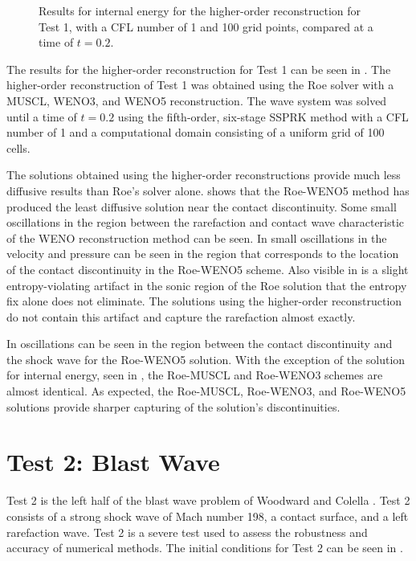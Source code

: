 \begin{figure}
	\caption[Results for internal energy for the higher-order reconstruction for Test 1, with a CFL number of 1 and 100 grid points, compared at a time of $t=0.2$.]{Results for internal energy for the higher-order reconstruction for Test 1, with a CFL number of 1 and 100 grid points, compared at a time of $t=0.2$.}
	\label{fig:Test1HORenergy}
\end{figure}
The results for the higher-order reconstruction for Test 1 can be seen in . The higher-order reconstruction of Test 1 was obtained using the Roe solver with a MUSCL, WENO3, and WENO5 reconstruction. The wave system was solved until a time of $t=0.2$ using the fifth-order, six-stage SSPRK method with a CFL number of 1 and a computational domain consisting of a uniform grid of 100 cells.

The solutions obtained using the higher-order reconstructions provide much less diffusive results than Roe's solver alone.  shows that the Roe-WENO5 method has produced the least diffusive solution near the contact discontinuity. Some small oscillations in the region between the rarefaction and contact wave characteristic of the WENO reconstruction method can be seen. In  small oscillations in the velocity and pressure can be seen in the region that corresponds to the location of the contact discontinuity in the Roe-WENO5 scheme. Also visible in  is a slight entropy-violating artifact in the sonic region of the Roe solution that the entropy fix alone does not eliminate. The solutions using the higher-order reconstruction do not contain this artifact and capture the rarefaction almost exactly.

In  oscillations can be seen in the region between the contact discontinuity and the shock wave for the Roe-WENO5 solution. With the exception of the solution for internal energy, seen in , the Roe-MUSCL and Roe-WENO3 schemes are almost identical. As expected, the Roe-MUSCL, Roe-WENO3, and Roe-WENO5 solutions provide sharper capturing of the solution's discontinuities.



\section{Test 2: Blast Wave}\label{sect:Test2}
Test 2 is the left half of the blast wave problem of Woodward and Colella \cite{WOODWARD1984115}. Test 2 consists of a strong shock wave of Mach number 198, a contact surface, and a left rarefaction wave. Test 2 is a severe test used to assess the robustness and accuracy of numerical methods. The initial conditions for Test 2 can be seen in .
